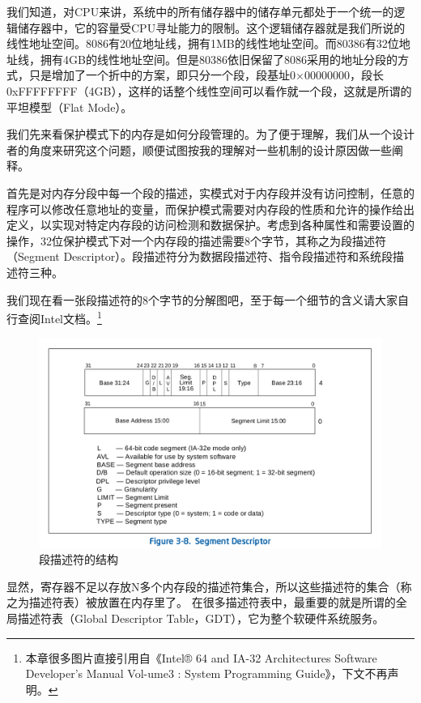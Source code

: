 \par 我们知道，对CPU来讲，系统中的所有储存器中的储存单元都处于一个统一的逻辑储存器中，它的容量受CPU寻址能力的限制。这个逻辑储存器就是我们所说的线性地址空间。8086有20位地址线，拥有1MB的线性地址空间。而80386有32位地址线，拥有4GB的线性地址空间。但是80386依旧保留了8086采用的地址分段的方式，只是增加了一个折中的方案，即只分一个段，段基址0×00000000，段长0xFFFFFFFF（4GB），这样的话整个线性空间可以看作就一个段，这就是所谓的平坦模型（Flat Mode）。

\par  我们先来看保护模式下的内存是如何分段管理的。为了便于理解，我们从一个设计者的角度来研究这个问题，顺便试图按我的理解对一些机制的设计原因做一些阐释。

\par 首先是对内存分段中每一个段的描述，实模式对于内存段并没有访问控制，任意的程序可以修改任意地址的变量，而保护模式需要对内存段的性质和允许的操作给出定义，以实现对特定内存段的访问检测和数据保护。考虑到各种属性和需要设置的操作，32位保护模式下对一个内存段的描述需要8个字节，其称之为段描述符（Segment Descriptor）。段描述符分为数据段描述符、指令段描述符和系统段描述符三种。

\par 我们现在看一张段描述符的8个字节的分解图吧，至于每一个细节的含义请大家自行查阅Intel文档。\footnote{本章很多图片直接引用自《Intel® 64 and IA-32 Architectures Software Developer’s Manual Vol-ume3 :
System Programming Guide》，下文不再声明。}

\begin{figure}[ht]
      \centering
      \includegraphics[scale=0.45]{picture/chapt6/segment_descriptor.png}
      \caption{段描述符的结构}
\end{figure}

 \par 显然，寄存器不足以存放N多个内存段的描述符集合，所以这些描述符的集合（称之为描述符表）被放置在内存里了。 在很多描述符表中，最重要的就是所谓的全局描述符表（Global Descriptor Table，GDT），它为整个软硬件系统服务。


